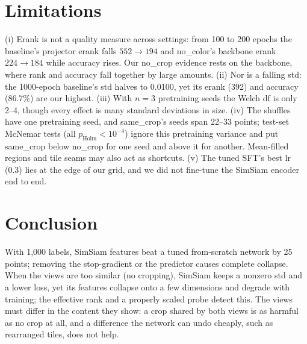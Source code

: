 \documentclass[10pt,twocolumn,letterpaper]{article}
\begin{document}
\section{Limitations}
\label{sec:limitations}

(i) Erank is not a quality measure across settings: from 100 to 200 epochs the baseline's projector erank falls $552\to194$ and no\_color's backbone erank $224\to184$ while accuracy rises. Our no\_crop evidence rests on the backbone, where rank and accuracy fall together by large amounts.
(ii) Nor is a falling std: the 1000-epoch baseline's std halves to 0.0100, yet its erank (392) and accuracy (86.7\%) are our highest.
(iii) With $n{=}3$ pretraining seeds the Welch df is only 2--4, though every effect is many standard deviations in size.
(iv) The shuffles have one pretraining seed, and same\_crop's seeds span 22--33 points; test-set McNemar tests (all $p_\text{Holm}<10^{-4}$) ignore this pretraining variance and put same\_crop below no\_crop for one seed and above it for another. Mean-filled regions and tile seams may also act as shortcuts.
(v) The tuned SFT's best lr (0.3) lies at the edge of our grid, and we did not fine-tune the SimSiam encoder end to end.

\section{Conclusion}
\label{sec:conclusion}
With 1,000 labels, SimSiam features beat a tuned from-scratch network by 25 points; removing the stop-gradient or the predictor causes complete collapse.
When the views are too similar (no cropping), SimSiam keeps a nonzero std and a lower loss, yet its features collapse onto a few dimensions and degrade with training; the effective rank and a properly scaled probe detect this.
The views must differ in the content they show: a crop shared by both views is as harmful as no crop at all, and a difference the network can undo cheaply, such as rearranged tiles, does not help.

{
    \small
    
    
}
\end{document}
